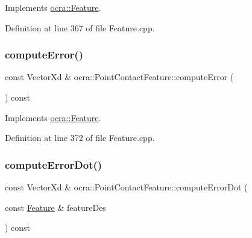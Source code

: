 Implements \hyperlink{classocra_1_1Feature_aaa74d6869f7e574fcc39d443581ddf77}{ocra\+::\+Feature}.



Definition at line 367 of file Feature.\+cpp.

\hypertarget{classocra_1_1PointContactFeature_ab8504be30483fdcbeb25f9003a34471b}{}\label{classocra_1_1PointContactFeature_ab8504be30483fdcbeb25f9003a34471b} 
\subsubsection{\texorpdfstring{compute\+Error()}{computeError()}\hspace{0.1cm}{\footnotesize\ttfamily [2/2]}}
{\footnotesize\ttfamily const Vector\+Xd \& ocra\+::\+Point\+Contact\+Feature\+::compute\+Error (\begin{DoxyParamCaption}{ }\end{DoxyParamCaption}) const\hspace{0.3cm}{\ttfamily [virtual]}}



Implements \hyperlink{classocra_1_1Feature_a88f87b496aedc7bf9f13b19bb8f9c7fa}{ocra\+::\+Feature}.



Definition at line 372 of file Feature.\+cpp.

\hypertarget{classocra_1_1PointContactFeature_a73527a8f55f6a693d975b7a4bf3bf422}{}\label{classocra_1_1PointContactFeature_a73527a8f55f6a693d975b7a4bf3bf422} 
\subsubsection{\texorpdfstring{compute\+Error\+Dot()}{computeErrorDot()}\hspace{0.1cm}{\footnotesize\ttfamily [1/2]}}
{\footnotesize\ttfamily const Vector\+Xd \& ocra\+::\+Point\+Contact\+Feature\+::compute\+Error\+Dot (\begin{DoxyParamCaption}\item[{const \hyperlink{classocra_1_1Feature}{Feature} \&}]{feature\+Des }\end{DoxyParamCaption}) const\hspace{0.3cm}{\ttfamily [virtual]}}



